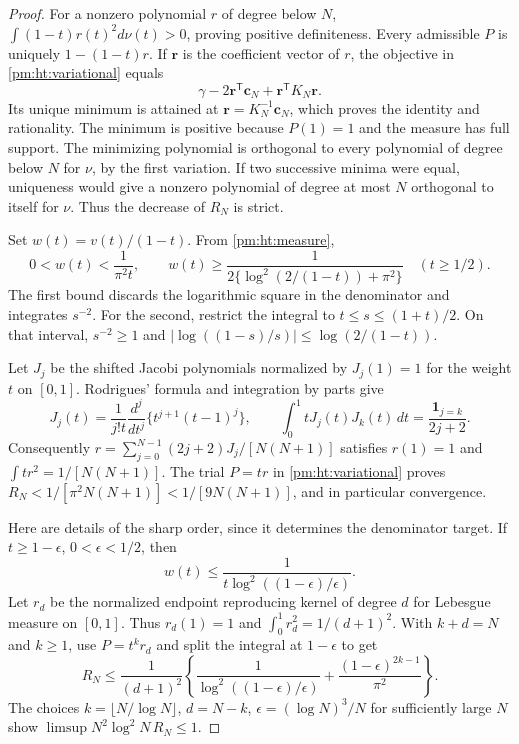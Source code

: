 \documentclass[11pt,a4paper]{article}
\theoremstyle{definition}
\theoremstyle{remark}
\numberwithin{equation}{section}
\begin{document}
\begin{proof}
For a nonzero polynomial $r$ of degree below $N$,
$\int(1-t)r(t)^2d\nu(t)>0$, proving positive definiteness.
Every admissible $P$ is uniquely $1-(1-t)r$.  If $\boldsymbol r$ is
the coefficient vector of $r$, the objective in
\eqref{pm:ht:variational} equals
\[
 \gamma-2\boldsymbol r^{\mathsf T}\boldsymbol c_N
       +\boldsymbol r^{\mathsf T}K_N\boldsymbol r.
\]
Its unique minimum is attained at
$\boldsymbol r=K_N^{-1}\boldsymbol c_N$, which proves the identity
and rationality.  The minimum is positive because $P(1)=1$ and the
measure has full support.  The minimizing polynomial is orthogonal
to every polynomial of degree below $N$ for $\nu$, by the first
variation.  If two successive minima were equal, uniqueness would
give a nonzero polynomial of degree at most $N$ orthogonal to itself
for $\nu$.  Thus the decrease of $R_N$ is strict.

Set $w(t)=v(t)/(1-t)$.  From \eqref{pm:ht:measure},
\begin{equation}\label{pm:ht:weight-bounds}
 0<w(t)<\frac1{\pi^2t},\qquad
 w(t)\geq\frac1{2\{\log^2(2/(1-t))+\pi^2\}}\quad(t\geq1/2).
\end{equation}
The first bound discards the logarithmic square in the denominator
and integrates $s^{-2}$.  For the second, restrict the integral to
$t\leq s\leq(1+t)/2$.  On that interval,
$s^{-2}\geq1$ and
$|\log((1-s)/s)|\leq\log(2/(1-t))$.

Let $J_j$ be the shifted Jacobi polynomials normalized by
$J_j(1)=1$ for the weight $t$ on $[0,1]$.  Rodrigues' formula and
integration by parts give
\[
 J_j(t)=\frac1{j!t}\frac{d^j}{dt^j}
        \{t^{j+1}(t-1)^j\},\qquad
 \int_0^1tJ_j(t)J_k(t)\,dt=\frac{\mathbf1_{j=k}}{2j+2}.
\]
Consequently
$r=\sum_{j=0}^{N-1}(2j+2)J_j/[N(N+1)]$ satisfies $r(1)=1$ and
$\int tr^2=1/[N(N+1)]$.  The trial $P=tr$ in
\eqref{pm:ht:variational} proves
$R_N<1/[\pi^2N(N+1)]<1/[9N(N+1)]$, and in particular convergence.

Here are details of the sharp order, since it determines the
denominator target.  If $t\geq1-\epsilon$, $0<\epsilon<1/2$, then
\[
 w(t)\leq\frac1{t\log^2((1-\epsilon)/\epsilon)}.
\]
Let $r_d$ be the normalized endpoint reproducing kernel of degree
$d$ for Lebesgue measure on $[0,1]$.  Thus $r_d(1)=1$ and
$\int_0^1r_d^2=1/(d+1)^2$.  With $k+d=N$ and $k\geq1$, use
$P=t^kr_d$ and split the integral at $1-\epsilon$ to get
\begin{equation}\label{pm:ht:upper-sharp}
 R_N\leq\frac1{(d+1)^2}
 \left\{\frac1{\log^2((1-\epsilon)/\epsilon)}
       +\frac{(1-\epsilon)^{2k-1}}{\pi^2}\right\}.
\end{equation}
The choices $k=\lfloor N/\log N\rfloor$, $d=N-k$,
$\epsilon=(\log N)^3/N$ for sufficiently large $N$ show
$\limsup N^2\log^2N\,R_N\leq1$.


\end{proof}
\end{document}
